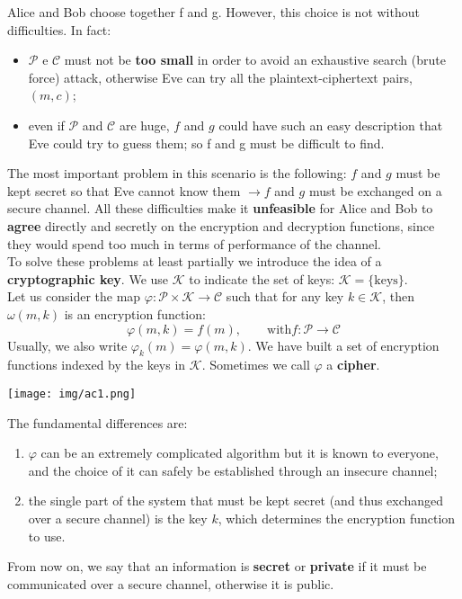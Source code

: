 \documentclass[a4paper, 10pt, titlepage]{article}
\begin{document}
Alice and Bob choose together f and g. However, this choice is not without difficulties. In fact:
\begin{itemize}
\item $\mathcal{P}$ e $\mathcal{C}$ must not be \textbf{too small} in order to avoid an exhaustive search (brute force) attack, otherwise Eve can try all the plaintext-ciphertext pairs, $(m, c)$;
\item even if $\mathcal{P}$ and $\mathcal{C}$ are huge, $f$ and $g$ could have such an easy description that Eve could try to guess them; so f and g must be difficult to find.
\end{itemize}
The most important problem in this scenario is the following: $f$ and $g$ must be kept secret so that Eve cannot know them $\rightarrow f$ and $g$ must be exchanged on a secure channel. All these difficulties make it \textbf{unfeasible} for Alice and Bob to \textbf{agree} directly and secretly on the encryption and decryption functions, since they would spend too much in terms of performance of the channel. \\
To solve these problems at least partially we introduce the idea of a
\textbf{cryptographic key}. We use $\mathcal{K}$ to indicate the set of keys: $\mathcal{K} = \{\text{keys}\}$. \medskip \\
Let us consider the map $\varphi : \mathcal{P} \times \mathcal{K} \rightarrow \mathcal{C}$ such that for any key $k \in \mathcal{K}$, then $\omega(m, k)$ is an encryption function:
$$\varphi(m, k) = f(m), \quad \quad \text{with} f : \mathcal{P} \rightarrow \mathcal{C}$$
Usually, we also write $\varphi_k (m) = \varphi(m, k)$.
We have built a set of encryption functions indexed by the keys in $\mathcal{K}$.
Sometimes we call $\varphi$ a \textbf{cipher}.
\begin{center}
\texttt{[image: img/ac1.png]}
\end{center}
The fundamental differences are:
\begin{enumerate}
\item $\varphi$ can be an extremely complicated algorithm but it is
known to everyone, and the choice of it can safely be established
through an insecure channel;
\item the single part of the system that must be kept secret (and thus exchanged over a secure channel) is the key $k$, which determines the encryption function to use.
\end{enumerate}
From now on, we say that an information is \textbf{secret} or \textbf{private} if it must be communicated over a secure channel, otherwise it is public.
\end{document}
